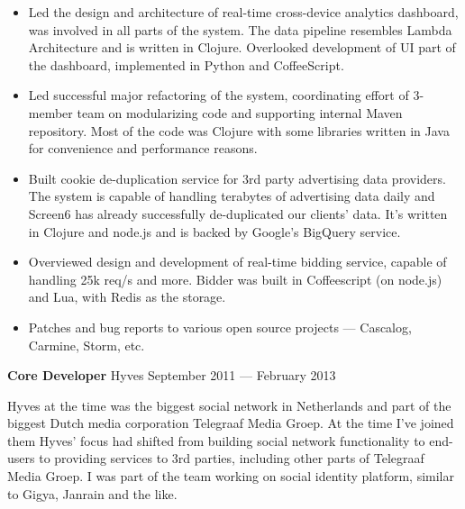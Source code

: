 \documentclass[margin]{res}
\begin{document}
\begin{resume}
\begin{itemize} \itemsep -1pt
\item Led the design and architecture of real-time cross-device
  analytics dashboard, was involved in all parts of the system. The
  data pipeline resembles Lambda Architecture and is written in
  Clojure. Overlooked development of UI part of the dashboard,
  implemented in Python and CoffeeScript.
\item Led successful major refactoring of the system, coordinating
  effort of 3-member team on modularizing code and supporting internal
  Maven repository. Most of the code was Clojure with some libraries
  written in Java for convenience and performance reasons.
\item Built cookie de-duplication service for 3rd party advertising
  data providers. The system is capable of handling terabytes of
  advertising data daily and Screen6 has already successfully
  de-duplicated our clients' data. It's written in Clojure and node.js
  and is backed by Google's BigQuery service.
\item Overviewed design and development of real-time bidding service,
  capable of handling 25k req/s and more. Bidder was built in
  Coffeescript (on node.js) and Lua, with Redis as the storage.
\item Patches and bug reports to various open source projects ---
  Cascalog, Carmine, Storm, etc.
\end{itemize}

{\bf Core Developer} Hyves \hfill September 2011 --- February 2013

Hyves at the time was the biggest social network in Netherlands and
part of the biggest Dutch media corporation Telegraaf Media Groep. At
the time I've joined them Hyves' focus had shifted from building
social network functionality to end-users to providing services to 3rd
parties, including other parts of Telegraaf Media Groep.  I was part of
the team working on social identity platform, similar to Gigya,
Janrain and the like.\\


\end{resume}
\end{document}
